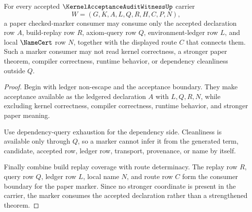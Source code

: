 \begin{theorem}
\label{thm:kernel-acceptance-audit-witness-marker-consumer-boundary}
For every accepted $\KernelAcceptanceAuditWitnessUp$ carrier
$$
W=(G,K,A,L,Q,R,H,C,P,N),
$$
a paper checked-marker consumer may consume only the accepted declaration row $A$, build-replay row $R$, axiom-query row $Q$, environment-ledger row $L$, and local $\NameCert$ row $N$, together with the displayed route $C$ that connects them. Such a marker consumer may not read kernel correctness, a stronger paper theorem, compiler correctness, runtime behavior, or dependency cleanliness outside $Q$.
\end{theorem}
\begin{proof}
Begin with ledger non-escape and the acceptance boundary. They make acceptance available as the ledgered declaration $A$ with $L,Q,R,N$, while excluding kernel correctness, compiler correctness, runtime behavior, and stronger paper meaning.

Use dependency-query exhaustion for the dependency side. Cleanliness is available only through $Q$, so a marker cannot infer it from the generated term, candidate, accepted row, ledger row, transport, provenance, or name by itself.

Finally combine build replay coverage with route determinacy. The replay row $R$, query row $Q$, ledger row $L$, local name $N$, and route row $C$ form the consumer boundary for the paper marker. Since no stronger coordinate is present in the carrier, the marker consumes the accepted declaration rather than a strengthened theorem.
\end{proof}

